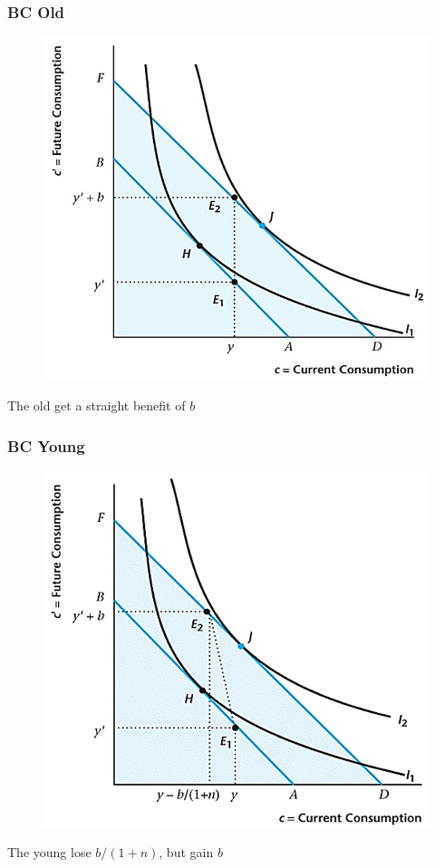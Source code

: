 \documentclass{beamer}
\begin{document}
\begin{frame}
\frametitle[alignment=center]{BC Old}
\begin{figure}
\centering
\includegraphics[scale=0.5]{Figures/W_Fig_10pt8.png}
\end{figure}
The old get a straight benefit of $b$
 \end{frame}


\begin{frame}
\frametitle[alignment=center]{BC Young}
\begin{figure}
\centering
\includegraphics[scale=0.5]{Figures/W_Fig_10pt9.png}
\end{figure}
The young lose $b/(1+n)$, but gain $b$
 \end{frame}
 
\end{document}
